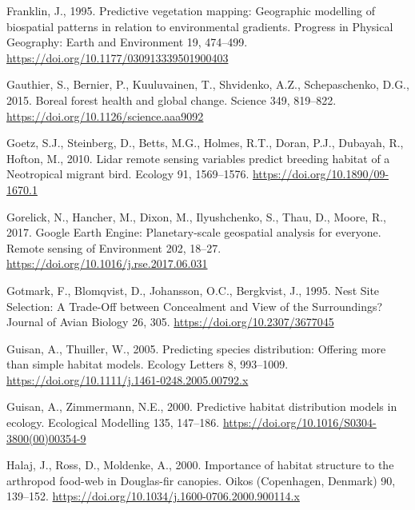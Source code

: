 \documentclass[
  12pt,
]{article}
\newlength{\cslhangindent}
\newlength{\cslentryspacingunit} %
\newenvironment{CSLReferences}[2] %
 {%
  \setlength{\parindent}{0pt}
  \ifodd #1
  \let\oldpar\par
  \def\par{\hangindent=\cslhangindent\oldpar}
  \fi
  \setlength{\parskip}{#2\cslentryspacingunit}
 }%
 {}
\begin{document}
\begin{CSLReferences}{1}{0}
\leavevmode{}%
Franklin, J., 1995. Predictive vegetation mapping: Geographic modelling of biospatial patterns in relation to environmental gradients. Progress in Physical Geography: Earth and Environment 19, 474--499. \url{https://doi.org/10.1177/030913339501900403}

\leavevmode{}%
Gauthier, S., Bernier, P., Kuuluvainen, T., Shvidenko, A.Z., Schepaschenko, D.G., 2015. Boreal forest health and global change. Science 349, 819--822. \url{https://doi.org/10.1126/science.aaa9092}

\leavevmode{}%
Goetz, S.J., Steinberg, D., Betts, M.G., Holmes, R.T., Doran, P.J., Dubayah, R., Hofton, M., 2010. Lidar remote sensing variables predict breeding habitat of a {Neotropical} migrant bird. Ecology 91, 1569--1576. \url{https://doi.org/10.1890/09-1670.1}

\leavevmode{}%
Gorelick, N., Hancher, M., Dixon, M., Ilyushchenko, S., Thau, D., Moore, R., 2017. Google {Earth} {Engine}: {Planetary}-scale geospatial analysis for everyone. Remote sensing of Environment 202, 18--27. \url{https://doi.org/10.1016/j.rse.2017.06.031}

\leavevmode{}%
Gotmark, F., Blomqvist, D., Johansson, O.C., Bergkvist, J., 1995. Nest {Site} {Selection}: {A} {Trade}-{Off} between {Concealment} and {View} of the {Surroundings}? Journal of Avian Biology 26, 305. \url{https://doi.org/10.2307/3677045}

\leavevmode{}%
Guisan, A., Thuiller, W., 2005. Predicting species distribution: Offering more than simple habitat models. Ecology Letters 8, 993--1009. \url{https://doi.org/10.1111/j.1461-0248.2005.00792.x}

\leavevmode{}%
Guisan, A., Zimmermann, N.E., 2000. Predictive habitat distribution models in ecology. Ecological Modelling 135, 147--186. \url{https://doi.org/10.1016/S0304-3800(00)00354-9}

\leavevmode{}%
Halaj, J., Ross, D., Moldenke, A., 2000. Importance of habitat structure to the arthropod food-web in {Douglas}-fir canopies. Oikos (Copenhagen, Denmark) 90, 139--152. \url{https://doi.org/10.1034/j.1600-0706.2000.900114.x}


\end{CSLReferences}
\end{document}
